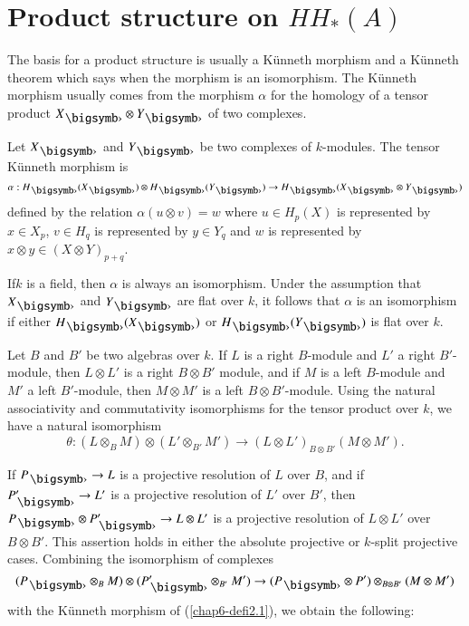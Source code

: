 \section{Product structure on $HH_{\ast}(A)$}\label{chap6-sec2}

The basis for a product structure is usually a K\"unneth morphism and
a K\"unneth theorem which says when the morphism is an
isomorphism. The K\"unneth morphism usually comes from the morphism
$\alpha$ for the homology of a tensor product $X_{\bigdot}\otimes
Y_{\bigdot}$ of two complexes.

\begin{definition}\label{chap6-defi2.1}
Let $X_{\bigdot}$ and $Y_{\bigdot}$ be two complexes of
$k$-modules. The tensor K\"unneth morphism is
$$
\alpha:H_{\bigdot}(X_{\bigdot})\otimes H_{\bigdot}(Y_{\bigdot})\to
H_{\bigdot}(X_{\bigdot}\otimes Y_{\bigdot})
$$
defined by the relation $\alpha(u\otimes v)=w$ where $u\in H_{p}(X)$
is represented by $x\in X_{p}$, $v\in H_{q}$ is represented by $y\in
Y_{q}$ and $w$ is represented by $x\otimes y\in (X\otimes Y)_{p+q}$.
\end{definition}


If\pageoriginale $k$ is a field, then $\alpha$ is always an
isomorphism. Under the assumption that $X_{\bigdot}$ and $Y_{\bigdot}$
are flat over $k$, it follows that $\alpha$ is an isomorphism if
either $H_{\bigdot}(X_{\bigdot})$ or $H_{\bigdot}(Y_{\bigdot})$ is
flat over $k$.

\begin{remark}\label{chap6-rem2.2}
Let $B$ and $B'$ be two algebras over $k$. If $L$ is a right
$B$-module and $L'$ a right $B'$-module, then $L\otimes L'$ is a right
$B\otimes B'$ module, and if $M$ is a left $B$-module and $M'$ a left
$B'$-module, then $M\otimes M'$ is a left $B\otimes B'$-module. Using
the natural associativity and commutativity isomorphisms for the
tensor product over $k$, we have a natural isomorphism 
$$
\theta:(L\otimes_{B}M)\otimes (L'\otimes_{B'}M')\to (L\otimes
L')_{B\otimes B'}(M\otimes M').
$$

If $P_{\bigdot}\to L$ is a projective resolution of $L$ over $B$, and
if $P'_{\bigdot}\to L'$ is a projective resolution of $L'$ over $B'$,
then $P_{\bigdot}\otimes P'_{\bigdot}\to L\otimes L'$ is a projective
resolution of $L\otimes L'$ over $B\otimes B'$. This assertion holds
in either the absolute projective or $k$-split projective
cases. Combining the isomorphism of complexes
$$
(P_{\bigdot}\otimes_{B}M)\otimes (P'_{\bigdot}\otimes_{B'}M')\to
(P_{\bigdot}\otimes P')\otimes_{B\otimes B'}(M\otimes M')
$$
with the K\"unneth morphism of (\ref{chap6-defi2.1}), we obtain the
following: 
\end{remark}

